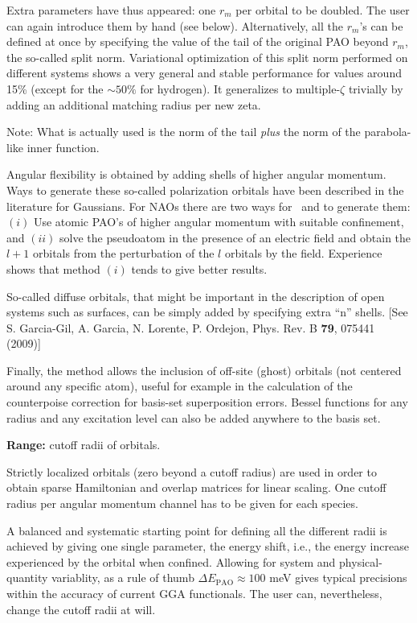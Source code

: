   Extra parameters have thus appeared: one $r_m$ per orbital to be doubled.
The user can again introduce them by hand (see  below).
Alternatively, all the $r_m$'s can be defined at once by specifying
the value of the tail of the original PAO beyond $r_m$, the so-called
split norm. Variational optimization
of this split norm performed on different systems
shows a very general and stable performance for values around
15\% (except for the $\sim 50\%$ for hydrogen).
  It generalizes to multiple-$\zeta$ trivially by adding an additional
matching radius per new zeta.

Note: What is actually used is the norm of the tail \emph{plus} the
norm of the parabola-like inner function.

Angular flexibility is obtained by adding shells of higher angular
momentum.  Ways to generate these so-called polarization orbitals have
been described in the literature for Gaussians.  For NAOs there are
two ways for \siesta\ and  to generate them: $(i)$
Use atomic PAO's of higher angular momentum with suitable confinement,
and $(ii)$ solve the pseudoatom in the presence of an electric field
and obtain the $l+1$ orbitals from the perturbation of the $l$
orbitals by the field. Experience shows that method $(i)$ tends to
give better results.

So-called diffuse orbitals, that might be important in the description
of open systems such as surfaces, can be simply added by specifying
extra ``n'' shells. [See S. Garcia-Gil, A. Garcia, N. Lorente,
  P. Ordejon, Phys. Rev. B \textbf{79}, 075441 (2009)]

Finally, the method allows the inclusion of off-site (ghost) orbitals
(not centered around any specific atom), useful for example in the
calculation of the counterpoise correction for basis-set superposition
errors.  Bessel functions for any radius and any excitation level can
also be added anywhere to the basis set.

\textbf{Range:} cutoff radii of orbitals.

Strictly localized orbitals (zero beyond a cutoff radius) are used in
order to obtain sparse Hamiltonian and overlap matrices for linear
scaling. One cutoff radius per angular momentum channel has to be
given for each species.

A balanced and systematic starting point for defining all the
different radii is achieved by giving one single parameter, the energy
shift, i.e., the energy increase experienced by the orbital when confined.
Allowing for system and physical-quantity variablity, as a rule of
thumb $\Delta E_{\mathrm{PAO}} \approx 100$ meV gives typical
precisions within the accuracy of current GGA functionals.  The user
can, nevertheless, change the cutoff radii at will.


